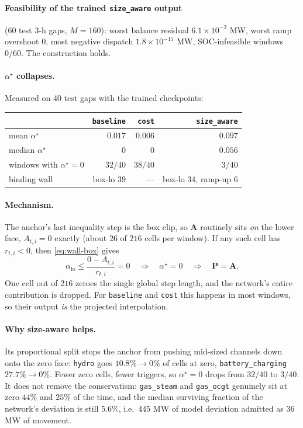 \documentclass[11pt]{article}
\begin{document}
\paragraph{Feasibility of the trained \texttt{size\_aware} output}
(60 test 3-h gaps, $M=160$): worst balance residual $6.1\times10^{-2}$ MW, worst
ramp overshoot $0$, most negative dispatch $1.8\times10^{-15}$ MW, SOC-infeasible
windows $0/60$. The construction holds.

\paragraph{$\alpha^{\star}$ collapses.} Measured on 40 test gaps with the trained
checkpoints:
\begin{center}
\begin{tabular}{lrrr}
\toprule
 & \texttt{baseline} & \texttt{cost} & \texttt{size\_aware} \\
\midrule
mean $\alpha^{\star}$          & $0.017$ & $0.006$ & $0.097$ \\
median $\alpha^{\star}$        & $0$     & $0$     & $0.056$ \\
windows with $\alpha^{\star}=0$ & $32/40$ & $38/40$ & $3/40$ \\
binding wall                   & box-lo $39$ & --- & box-lo $34$, ramp-up $6$ \\
\bottomrule
\end{tabular}
\end{center}

\paragraph{Mechanism.} The anchor's last inequality step is the box clip, so
$\mathbf{A}$ routinely sits \emph{on} the lower face, $A_{t,i}=0$ exactly (about
$26$ of $216$ cells per window). If any such cell has $r_{t,i}<0$, then
\eqref{eq:wall-box} gives
\begin{equation}
\alpha_{\mathrm{lo}}\le\frac{0-A_{t,i}}{r_{t,i}}=0
\quad\Longrightarrow\quad \alpha^{\star}=0
\quad\Longrightarrow\quad \mathbf{P}=\mathbf{A}.
\end{equation}
One cell out of $216$ zeroes the single global step length, and the network's
entire contribution is dropped. For \texttt{baseline} and \texttt{cost} this
happens in most windows, so their output \emph{is} the projected interpolation.

\paragraph{Why size-aware helps.} Its proportional split stops the anchor from
pushing mid-sized channels down onto the zero face: \texttt{hydro} goes
$10.8\%\to0\%$ of cells at zero, \texttt{battery\_charging} $27.7\%\to0\%$. Fewer
zero cells, fewer triggers, so $\alpha^{\star}=0$ drops from $32/40$ to $3/40$.
It does not remove the conservatism: \texttt{gas\_steam} and \texttt{gas\_ocgt}
genuinely sit at zero $44\%$ and $25\%$ of the time, and the median surviving
fraction of the network's deviation is still $5.6\%$, i.e.\ $445$ MW of model
deviation admitted as $36$ MW of movement.
\end{document}
